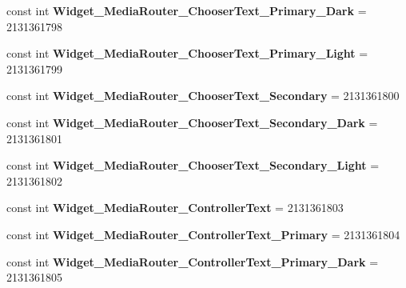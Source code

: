 \begin{DoxyCompactItemize}
const int {\bfseries Widget\+\_\+\+Media\+Router\+\_\+\+Chooser\+Text\+\_\+\+Primary\+\_\+\+Dark} = 2131361798
\item 
\mbox{\label{class_pinned_app_1_1_droid_1_1_resource_1_1_style_a8a0a99bd70c67f95bf122441903a7943}} 
const int {\bfseries Widget\+\_\+\+Media\+Router\+\_\+\+Chooser\+Text\+\_\+\+Primary\+\_\+\+Light} = 2131361799
\item 
\mbox{\label{class_pinned_app_1_1_droid_1_1_resource_1_1_style_a90abb008151ff1f645418733412dc48f}} 
const int {\bfseries Widget\+\_\+\+Media\+Router\+\_\+\+Chooser\+Text\+\_\+\+Secondary} = 2131361800
\item 
\mbox{\label{class_pinned_app_1_1_droid_1_1_resource_1_1_style_a85f3136a258eca31772e1e148c80e6e3}} 
const int {\bfseries Widget\+\_\+\+Media\+Router\+\_\+\+Chooser\+Text\+\_\+\+Secondary\+\_\+\+Dark} = 2131361801
\item 
\mbox{\label{class_pinned_app_1_1_droid_1_1_resource_1_1_style_a6ce99c1b7c2060328dac02ed2267d90a}} 
const int {\bfseries Widget\+\_\+\+Media\+Router\+\_\+\+Chooser\+Text\+\_\+\+Secondary\+\_\+\+Light} = 2131361802
\item 
\mbox{\label{class_pinned_app_1_1_droid_1_1_resource_1_1_style_ab2abd331a90a2562c326db94b4eed8b0}} 
const int {\bfseries Widget\+\_\+\+Media\+Router\+\_\+\+Controller\+Text} = 2131361803
\item 
\mbox{\label{class_pinned_app_1_1_droid_1_1_resource_1_1_style_a3dcd70d61d91ca43c693add06bc7c3f0}} 
const int {\bfseries Widget\+\_\+\+Media\+Router\+\_\+\+Controller\+Text\+\_\+\+Primary} = 2131361804
\item 
\mbox{\label{class_pinned_app_1_1_droid_1_1_resource_1_1_style_a82642b75cdeb2f51f3282c02cb15f1d1}} 
const int {\bfseries Widget\+\_\+\+Media\+Router\+\_\+\+Controller\+Text\+\_\+\+Primary\+\_\+\+Dark} = 2131361805
\item 

\end{DoxyCompactItemize}
